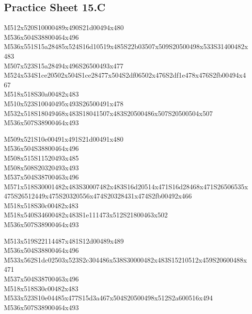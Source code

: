 \documentclass{article}
\begin{document}
\subsection{Practice Sheet 15.C}

\begin{multicols}{5}
\begin{center}

M512x520S10000489x490S21d00494x480 %
\\M536x504S38800464x496 %
\\M536x551S15a28485x524S16d10519x485S22b03507x509S20500498x533S31400482x483 %
\\M507x523S15a28494x496S26500493x477 %
\\M524x534S1ce20502x504S1ce28477x504S2df06502x476S2df1e478x476S2fb00494x467 %
\\M518x518S30a00482x483 %
\\M510x523S10040495x493S26500491x478 %
\\M532x518S18049468x483S18041507x483S20500486x507S20500504x507 %
\\M536x507S38900464x493 %
\vfil
\columnbreak

M509x521S10e00491x491S21d00491x480 %
\\M536x504S38800464x496 %
\\M508x515S11520493x485 %
\\M508x508S20320493x493 %
\\M537x504S38700463x496 %
\\M571x518S30001482x483S30007482x483S16d20514x471S16d28468x471S26506535x475S26512449x475S20320556x474S20328431x474S2fb00492x466 %
\\M518x518S30c00482x483 %
\\M518x540S34600482x483S1e111473x512S21800463x502 %
\\M536x507S38900464x493 %
\vfil
\columnbreak

M513x519S22114487x481S12d00489x489 %
\\M536x504S38800464x496 %
\\M533x562S1dc02503x523S2c304486x538S30000482x483S15210512x459S20600488x471 %
\\M537x504S38700463x496 %
\\M518x518S30c00482x483 %
\\M533x523S10e04485x477S15d3a467x504S20500498x512S2a600516x494 %
\\M536x507S38900464x493 %
\vfil
\columnbreak


\end{center}
\end{multicols}
\end{document}

